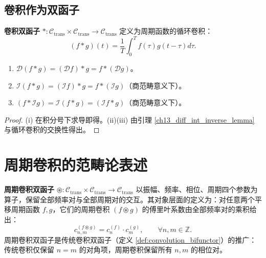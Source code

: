 \subsection{卷积作为双函子}

\begin{definition}[卷积双函子]\label{def:convolution_bifunctor}
\textbf{卷积双函子} $*: \mathcal{C}_{\text{trans}} \times \mathcal{C}_{\text{trans}} \to \mathcal{C}_{\text{trans}}$ 定义为周期函数的循环卷积：
\[
(f * g)(t) = \frac{1}{T} \int_0^T f(\tau) g(t-\tau) d\tau.
\]
\end{definition}

\begin{proposition}\label{prop:convolution_diff_int}
\begin{enumerate}[label=(\roman*)]
    \item $\mathcal{D}(f * g) = (\mathcal{D}f) * g = f * (\mathcal{D}g)$。
    \item $\mathcal{I}(f * g) = (\mathcal{I}f) * g = f * (\mathcal{I}g)$（商范畴意义下）。
    \item $(f * \mathcal{I}g) = \mathcal{I}(f * g) = (\mathcal{I}f * g)$（商范畴意义下）。
\end{enumerate}
\end{proposition}

\begin{proof}
(i) 在积分号下求导即得。(ii)(iii) 由引理 \ref{ch13_diff_int_inverse_lemma} 与循环卷积的交换性得出。
\end{proof}

\section{周期卷积的范畴论表述}\label{sec:periodic_convolution_category}

\begin{definition}[周期卷积双函子]\label{def:periodic_convolution_bifunctor}
\textbf{周期卷积双函子} $\circledast: \mathcal{C}_{\text{trans}} \times \mathcal{C}_{\text{trans}} \to \mathcal{C}_{\text{trans}}$ 以振幅、频率、相位、周期四个参数为算子，保留全部频率对与全部周期对的交互。其对象层面的定义为：对任意两个平移周期函数 $f, g$，它们的周期卷积 $(f \circledast g)$ 的傅里叶系数由全部频率对的乘积给出：
\[
c_{n,m}^{(f \circledast g)} = c_n^{(f)} \cdot c_m^{(g)}, \qquad \forall n, m \in \mathbb{Z}.
\]
周期卷积双函子是传统卷积双函子（定义 \ref{def:convolution_bifunctor}）的推广：传统卷积仅保留 $n=m$ 的对角项，周期卷积保留所有 $n,m$ 的相位对。
\end{definition}

